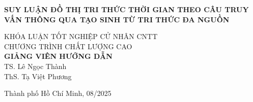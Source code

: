 \begin{titlepage}
\begin{center}

{ \Large \bfseries SUY LUẬN ĐỒ THỊ TRI THỨC THỜI
GIAN THEO CÂU TRUY VẤN THÔNG QUA TẠO SINH TỪ TRI THỨC ĐA
NGUỒN \\[2cm] } 


\normalsize KHÓA LUẬN TỐT NGHIỆP CỬ NHÂN CNTT\\
\normalsize CHƯƠNG TRÌNH CHẤT LƯỢNG CAO\\[2cm]

\textbf{GIẢNG VIÊN HƯỚNG DẪN}\\
TS. Lê Ngọc Thành\\
ThS. Tạ Việt Phương\\


\vfill
Thành phố Hồ Chí Minh, 08/2025

\end{center}
\end{titlepage}

